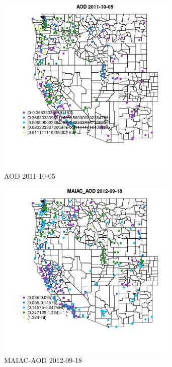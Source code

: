 \begin{figure} 
\centering  
\includegraphics[width=0.77\textwidth]{Code_Outputs/ML_input_report_ML_input_PM25_Step5_part_d_de_duplicated_aves_ML_input_MapObsAOD2011-10-05.jpg} 
\caption{\label{fig:ML_input_report_ML_input_PM25_Step5_part_d_de_duplicated_aves_ML_inputMapObsAOD2011-10-05}AOD 2011-10-05} 
\end{figure} 
 

\begin{figure} 
\centering  
\includegraphics[width=0.77\textwidth]{Code_Outputs/ML_input_report_ML_input_PM25_Step5_part_d_de_duplicated_aves_ML_input_MapObsMAIAC_AOD2012-09-18.jpg} 
\caption{\label{fig:ML_input_report_ML_input_PM25_Step5_part_d_de_duplicated_aves_ML_inputMapObsMAIAC_AOD2012-09-18}MAIAC-AOD 2012-09-18} 
\end{figure} 
 


